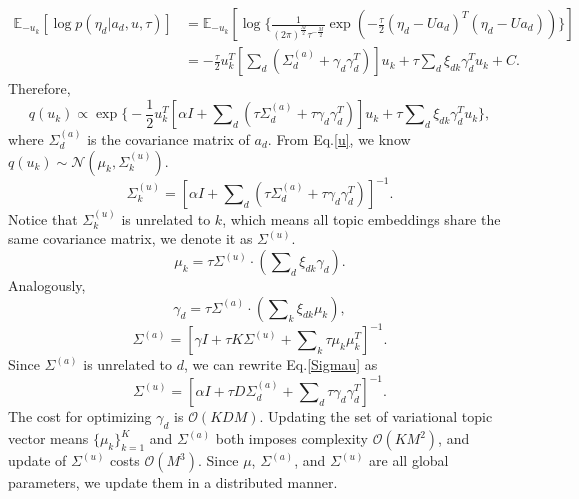 \documentclass[sigconf]{acmart}
\renewcommand*{\bm}[1]{#1}%
\begin{document}
\begin{appendices}
\begin{equation}
\label{ }
\begin{split}
\mathbb{E}_{-\bm{u}_k}\left[\log p(\bm{\eta}_d | \bm{a}_d, \bm{u}, \tau)\right] &= \mathbb{E}_{-\bm{u}_k}\left[\log \big\{\frac{1}{(2\pi)^{\frac{M}{2}}\tau^{-\frac{M}{2}}}\exp(-\frac{\tau}{2}(\bm{\eta}_d-\bm{U}\bm{a}_d)^T(\bm{\eta}_d-\bm{U}\bm{a}_d))\big\}\right]\\
&= -\frac{\tau}{2}\bm{u}_k^T\left[\sum\nolimits_d(\Sigma_d^{(a)} + \bm{\gamma}_d\bm{\gamma}_d^T)\right]\bm{u}_k + \tau\sum\nolimits_d\xi_{dk}\bm{\gamma}_d^T\bm{u}_k + C.
\end{split}
\end{equation}
Therefore,
\begin{equation}
\label{u}
q(\bm{u}_k) \propto \exp\big\{ -\frac{1}{2}\bm{u}_k^T\left[\alpha \bm{I} + \sum\nolimits_d(\tau\Sigma^{(a)}_d + \tau\bm{\gamma}_d\bm{\gamma}_d^T)\right]\bm{u}_k + \tau\sum\nolimits_d\xi_{dk}\bm{\gamma}_d^T\bm{u}_k \big\},
\end{equation}
where $\Sigma_d^{(a)}$ is the covariance matrix of $\bm{a}_d$. From Eq.\eqref{u}, we know $q(\bm{u}_k) \sim \mathcal{N}(\bm{\mu}_k, \Sigma_k^{(u)})$.
\begin{equation}
\label{Sigmau}
\Sigma_k^{(u)} = \left[\alpha\bm{I} + \sum\nolimits_d(\tau\Sigma^{(a)}_d + \tau\bm{\gamma}_d\bm{\gamma}_d^T)\right]^{-1}.
\end{equation}
Notice that $\Sigma_k^{(u)}$ is unrelated to $k$, which means all topic embeddings share the same covariance matrix, we denote it as $\Sigma^{(u)}$.
\begin{equation}
\label{suppeq:vi-u}
\bm{\mu}_k = \tau\Sigma^{(u)}\cdot(\sum\nolimits_d\xi_{dk}\bm{\gamma}_d).
\end{equation}
Analogously, 
\begin{equation}
\label{suppeq:vi-a}
\bm{\gamma}_d = \tau\Sigma^{(a)}\cdot(\sum\nolimits_k\xi_{dk}\bm{\mu}_k),
\end{equation}
\begin{equation}
\label{suppeq:vi-Sa}
\Sigma^{(a)} = \left[\gamma\bm{I} + \tau K \Sigma^{(u)} +\sum\nolimits_k\tau\bm{\mu}_k\bm{\mu}_k^T\right]^{-1}.
\end{equation}
Since $\Sigma^{(a)}$ is unrelated to $d$, we can rewrite Eq.\eqref{Sigmau} as
\begin{equation}
\label{suppeq:vi-Su}
\Sigma^{(u)} = \left[\alpha\bm{I} + \tau D\Sigma^{(a)}_d +\sum\nolimits_d \tau\bm{\gamma}_d\bm{\gamma}_d^T\right]^{-1}.
\end{equation}
The cost for optimizing $\bm{\gamma}_d$ is $\mathcal{O}(KDM)$. Updating the set of variational topic vector means $\{\bm{\mu}_k\}_{k=1}^{K}$ and $\Sigma^{(a)}$ both imposes complexity $\mathcal{O}(KM^2)$, and update of $\Sigma^{(u)}$ costs $\mathcal{O}(M^3)$. Since $\bm{\mu}$, $\Sigma^{(a)}$, and $\Sigma^{(u)}$ are all global parameters, we update them in a distributed manner.


\end{appendices}
\end{document}
